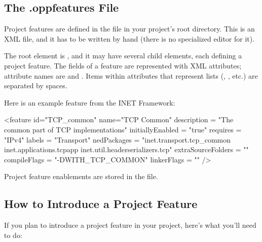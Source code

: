 \subsection{The .oppfeatures File}
\label{sec:build-sim-progs:oppfeatures-file}

Project features are defined in the  file in your project's
root directory. This is an XML file, and it has to be written by hand
(there is no specialized editor for it).

The root element is , and it may have several 
child elements, each defining a project feature. The fields of a feature
are represented with XML attributes; attribute names are  and . Items within attributes
that represent lists (, , etc.) are separated by spaces.

Here is an example feature from the INET Framework:
\begin{filelisting}
<feature
  id="TCP_common"
  name="TCP Common"
  description = "The common part of TCP implementations"
  initiallyEnabled = "true"
  requires = "IPv4"
  labels = "Transport"
  nedPackages = "inet.transport.tcp_common
                 inet.applications.tcpapp
                 inet.util.headerserializers.tcp"
  extraSourceFolders = ""
  compileFlags = "-DWITH_TCP_COMMON"
  linkerFlags = ""
  />
\end{filelisting}

Project feature enablements are stored in the  file.


\subsection{How to Introduce a Project Feature}
\label{sec:build-sim-progs:introducing-project-features}

If you plan to introduce a project feature in your project, here's what you'll need
to do:

